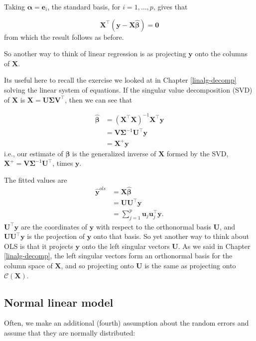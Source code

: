 \documentclass[
]{book}
\theoremstyle{definition}
\theoremstyle{definition}
\theoremstyle{definition}
\theoremstyle{definition}
\theoremstyle{remark}
\begin{document}
Taking \(\boldsymbol \alpha= \mathbf e_i\), the standard basis, for \(i=1, \ldots, p\), gives that

\[\mathbf X^\top(\mathbf y-\mathbf X\hat{\boldsymbol \beta})={\boldsymbol 0}\]
from which the result follows as before.

So another way to think of linear regression is as projecting \(\mathbf y\) onto the columns of \(\mathbf X\).

Its useful here to recall the exercise we looked at in Chapter \ref{linalg-decomp} solving the linear system of equations. If the singular value decomposition (SVD) of \(\mathbf X\) is \(\mathbf X= \mathbf U\boldsymbol{\Sigma}\mathbf V^\top\), then we can see that

\begin{align*}
\hat{\boldsymbol \beta}&=(\mathbf X^\top \mathbf X)^{-1}\mathbf X^\top \mathbf y\\
&=\mathbf V\boldsymbol{\Sigma}^{-1}\mathbf U^\top \mathbf y\\
&= \mathbf X^{+}\mathbf y
\end{align*}
i.e., our estimate of \(\boldsymbol \beta\) is the generalized inverse of \(\mathbf X\) formed by the SVD, \(\mathbf X^{+}=\mathbf V\boldsymbol{\Sigma}^{-1}\mathbf U^\top\), times \(\mathbf y\).

The fitted values are
\begin{align}
\hat{\mathbf y}^{ols} &= \mathbf X\hat{\boldsymbol \beta}\\
&=\mathbf U\mathbf U^\top \mathbf y\\
&=\sum_{j=1}^p \mathbf u_j \mathbf u_j^\top \mathbf y.\label{eq:lmsvd}
\end{align}
\(\mathbf U^\top \mathbf y\) are the coordinates of \(\mathbf y\) with respect to the orthonormal basis \(\mathbf U\), and \(\mathbf U\mathbf U^\top \mathbf y\) is the projection of \(\mathbf y\) onto that basis. So yet another way to think about OLS is that it projects \(\mathbf y\) onto the left singular vectors \(\mathbf U\). As we said in Chapter \ref{linalg-decomp}, the left singular vectors form an orthonormal basis for the column space of \(\mathbf X\), and so projecting onto \(\mathbf U\) is the same as projecting onto \(\mathcal{C}(\mathbf X)\).

\subsection{Normal linear model}\label{normal-linear-model}

Often, we make an additional (fourth) assumption about the random errors and assume that they are normally distributed:
\end{document}
